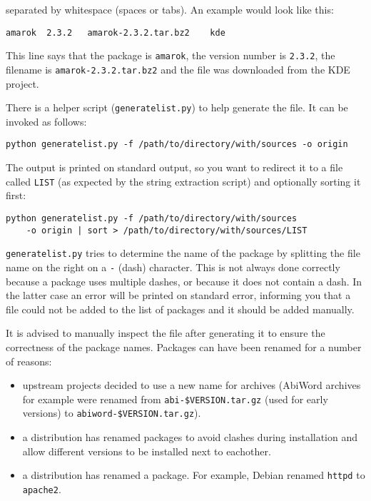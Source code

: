 \documentclass[10pt,a4paper]{article}
\begin{document}
separated by whitespace (spaces or tabs). An example would look like this:

\begin{verbatim}
amarok	2.3.2	amarok-2.3.2.tar.bz2	kde
\end{verbatim}

This line says that the package is \texttt{amarok}, the version number is
\texttt{2.3.2}, the filename is \texttt{amarok-2.3.2.tar.bz2} and the file
was downloaded from the KDE project.

There is a helper script (\texttt{generatelist.py}) to help generate the file.
It can be invoked as follows:

\begin{verbatim}
python generatelist.py -f /path/to/directory/with/sources -o origin
\end{verbatim}

The output is printed on standard output, so you want to redirect it to a file
called \texttt{LIST} (as expected by the string extraction script) and
optionally sorting it first:

\begin{verbatim}
python generatelist.py -f /path/to/directory/with/sources
    -o origin | sort > /path/to/directory/with/sources/LIST
\end{verbatim}

\texttt{generatelist.py} tries to determine the name of the package by
splitting the file name on the right on a \texttt{-} (dash)
character. This is not always done correctly because a package uses multiple
dashes, or because it does not contain a dash. In the latter case an error
will be printed on standard error, informing you that a file could not be
added to the list of packages and it should be added manually.

It is advised to manually inspect the file after generating it to ensure the
correctness of the package names. Packages can have been renamed for a number
of reasons:

\begin{itemize}
\item upstream projects decided to use a new name for archives (AbiWord
archives for example were renamed from \texttt{abi-\$VERSION.tar.gz} (used for
early versions) to \texttt{abiword-\$VERSION.tar.gz}).
\item a distribution has renamed packages to avoid clashes during installation
and allow different versions to be installed next to eachother.
\item a distribution has renamed a package. For example, Debian renamed
\texttt{httpd} to \texttt{apache2}.
\end{itemize}
\end{document}

